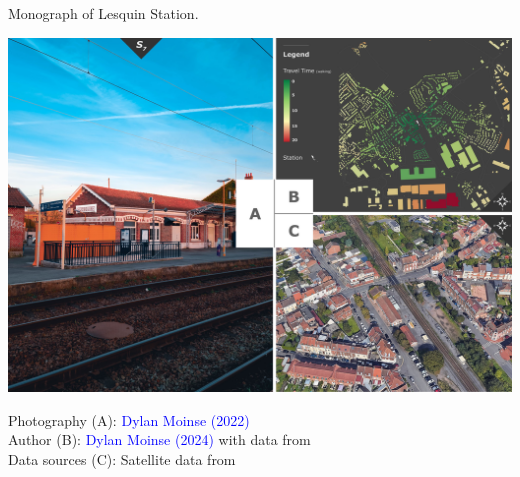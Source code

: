 \begin{refsegment}
\begin{carte}[h!]\vspace*{4pt}
\caption{Monograph of Lesquin Station.}
\label{fig-chap3:monographie-lesquin}
\centerline{\includegraphics[height=.35\pageheight]{src/Figures/Chap-3/EN_Gare_Lesquin.jpg}}
\vspace{5pt}
\begin{flushright}\scriptsize{
Photography (A): \textcolor{blue}{Dylan Moinse (2022)}
\\
Author (B): \textcolor{blue}{Dylan Moinse (2024)} with data from \textcolor{blue}{\textcite{openstreetmap_openstreetmap_2023}}
\\
Data sources (C): Satellite data from \textcolor{blue}{\textcite{google_earth_google_2023}}
}\end{flushright}
\end{carte}


\end{refsegment}
